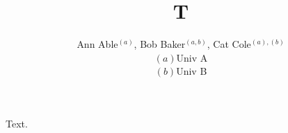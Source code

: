 \documentclass{article}
\begin{document}
\title{T}
\author{Ann Able$^{(a)}$, Bob Baker$^{(a,b)}$, Cat Cole$^{(a),(b)}$\\ $(a)$Univ A\\ $(b)$Univ B}
\maketitle
Text.
\end{document}
